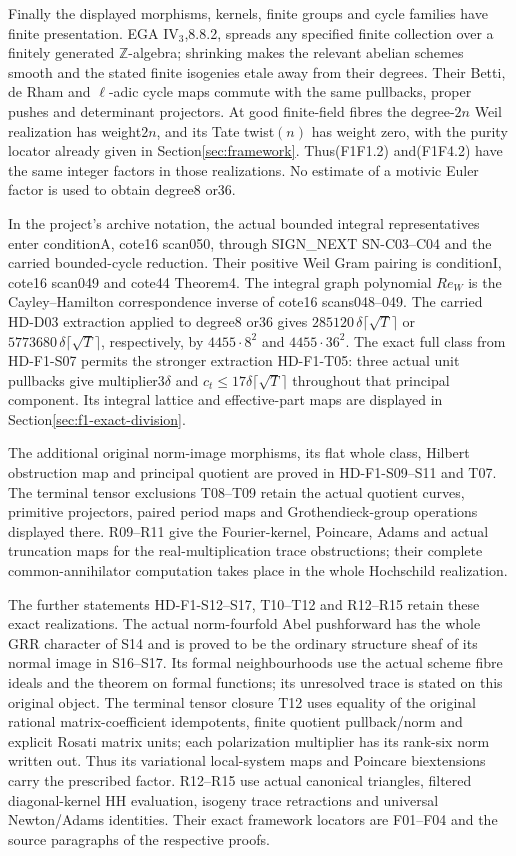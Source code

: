 Finally the displayed morphisms, kernels, finite groups and
cycle families have finite presentation. EGA IV$_3$,8.8.2,
spreads any specified finite collection over a finitely generated
$\mathbb Z$-algebra; shrinking makes the relevant abelian schemes
smooth and the stated finite isogenies etale away from their
degrees. Their Betti, de Rham and $\ell$-adic cycle maps commute
with the same pullbacks, proper pushes and determinant projectors.
At good finite-field fibres the degree-$2n$ Weil realization has
weight$2n$, and its Tate twist$(n)$ has weight zero, with the
purity locator already given in Section\ref{sec:framework}.
Thus(F1F1.2) and(F1F4.2) have the same integer factors in those
realizations. No estimate of a motivic Euler factor is used to
obtain degree8 or36.

In the project's archive notation, the actual bounded integral
representatives enter conditionA, cote16 scan050, through
SIGN\_NEXT SN-C03--C04 and the carried bounded-cycle reduction.
Their positive Weil Gram pairing is conditionI, cote16 scan049
and cote44 Theorem4. The integral graph polynomial $Re_W$ is
the Cayley--Hamilton correspondence inverse of cote16 scans048--049.
The carried HD-D03 extraction applied to degree8 or36 gives
$285120\,\delta\lceil\sqrt T\rceil$ or
$5773680\,\delta\lceil\sqrt T\rceil$, respectively, by
$4455\cdot8^2$ and $4455\cdot36^2$. The exact full class
from HD-F1-S07 permits the stronger extraction HD-F1-T05:
three actual unit pullbacks give multiplier$3\delta$ and
$c_t\le17\delta\lceil\sqrt T\rceil$ throughout that
principal component. Its integral lattice and effective-part
maps are displayed in Section\ref{sec:f1-exact-division}.

The additional original norm-image morphisms, its flat whole class,
Hilbert obstruction map and principal quotient are proved in
HD-F1-S09--S11 and T07. The terminal tensor exclusions T08--T09
retain the actual quotient curves, primitive projectors, paired
period maps and Grothendieck-group operations displayed there.
R09--R11 give the Fourier-kernel, Poincare, Adams and actual
truncation maps for the real-multiplication trace obstructions;
their complete common-annihilator computation takes place in
the whole Hochschild realization.


The further statements HD-F1-S12--S17, T10--T12 and R12--R15 retain
these exact realizations. The actual norm-fourfold Abel pushforward
has the whole GRR character of S14 and is proved to be the ordinary
structure sheaf of its normal image in S16--S17. Its formal neighbourhoods
use the actual scheme fibre ideals and the theorem on formal functions;
its unresolved trace is stated on this original object.
The terminal tensor closure T12 uses equality of the original rational
matrix-coefficient idempotents, finite quotient pullback/norm and explicit
Rosati matrix units; each polarization multiplier has its rank-six norm
written out. Thus its variational local-system maps and Poincare
biextensions carry the prescribed factor. R12--R15 use actual canonical
triangles, filtered diagonal-kernel HH evaluation, isogeny trace retractions
and universal Newton/Adams identities. Their exact framework locators are
F01--F04 and the source paragraphs of the respective proofs.


